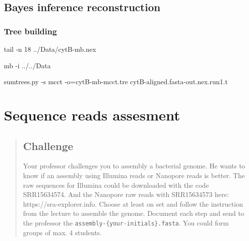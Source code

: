 \documentclass[
  letterpaper,
  DIV=11,
  numbers=noendperiod]{scrreprt}
\newenvironment{Shaded}{\begin{snugshade}}{\end{snugshade}}
\newcommand{\AttributeTok}[1]{\textcolor[rgb]{0.40,0.46,0.14}{#1}}
\newcommand{\ExtensionTok}[1]{\textcolor[rgb]{0.00,0.46,0.62}{#1}}
\newcommand{\FunctionTok}[1]{\textcolor[rgb]{0.28,0.35,0.67}{#1}}
\newcommand{\NormalTok}[1]{\textcolor[rgb]{0.00,0.46,0.62}{#1}}
\newcommand{\OperatorTok}[1]{\textcolor[rgb]{0.37,0.37,0.37}{#1}}
\begin{document}
\hypertarget{bayes-inference-reconstruction}{%
\section*{Bayes inference
reconstruction}\label{bayes-inference-reconstruction}}

\hypertarget{tree-building-1}{%
\subsection*{Tree building}\label{tree-building-1}}

\begin{Shaded}
\begin{Highlighting}[]
\FunctionTok{tail} \AttributeTok{{-}n}\NormalTok{ 18 ../Data/cytB{-}mb.nex}
\end{Highlighting}
\end{Shaded}

\begin{Shaded}
\begin{Highlighting}[]
\ExtensionTok{mb} \AttributeTok{{-}i}\NormalTok{ ../../Data}
\end{Highlighting}
\end{Shaded}

\begin{Shaded}
\begin{Highlighting}[]
\ExtensionTok{sumtrees.py} \AttributeTok{{-}s}\NormalTok{ mcct }\AttributeTok{{-}o}\OperatorTok{=}\NormalTok{cytB{-}mb{-}mcct.tre cytB{-}aligned.fasta{-}out.nex.run1.t}
\end{Highlighting}
\end{Shaded}

\hypertarget{sequence-reads-assesment}{%
\chapter{Sequence reads assesment}\label{sequence-reads-assesment}}

\begin{quote}
\hypertarget{challenge-4}{%
\section*{Challenge}\label{challenge-4}}

Your professor challenges you to assembly a bacterial genome. He wants
to know if an assembly using Illumina reads or Nanopore reads is better.
The raw sequences for Illumina could be downloaded with the code
SRR15634574. And the Nanopore raw reads with SRR15634573 here:
https://sra-explorer.info. Choose at least on set and follow the
instruction from the lecture to assemble the genome. Document each step
and send to the professor the \texttt{assembly-\{your-initials\}.fasta}.
You could form groups of max. 4 students.
\end{quote}
\end{document}
